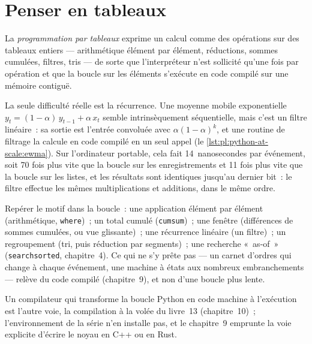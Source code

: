 \section{Penser en tableaux}

\begin{definition}\label{def:pl:python-at-scale:array}
La \emph{programmation par tableaux} exprime un calcul comme des opérations sur des tableaux entiers --- arithmétique
élément par élément, réductions, sommes cumulées, filtres, tris --- de sorte que l'interpréteur n'est sollicité qu'une fois par opération et que la boucle
sur les éléments s'exécute en code compilé sur une mémoire contiguë.
\end{definition}

La seule difficulté réelle est la récurrence. Une moyenne mobile exponentielle $y_t = (1-\alpha)\,y_{t-1} + \alpha\,x_t$ semble intrinsèquement
séquentielle, mais c'est un filtre linéaire~: sa sortie est l'entrée convoluée avec $\alpha(1-\alpha)^k$, et une routine de filtrage la calcule
en code compilé en un seul appel (le \cref{lst:pl:python-at-scale:ewma}). Sur l'ordinateur portable, cela fait 14~nanosecondes par événement, soit 70 fois
plus vite que la boucle sur les enregistrements et 11 fois plus vite que la boucle sur les listes, et les résultats sont identiques jusqu'au dernier bit~:
le filtre effectue les mêmes multiplications et additions, dans le même ordre.

\label{lst:pl:python-at-scale:ewma}

\begin{method}\label{met:pl:python-at-scale:arrays}
Repérer le motif dans la boucle~: une application élément par élément (arithmétique, \texttt{where})~; un total cumulé (\texttt{cumsum})~; une fenêtre
(différences de sommes cumulées, ou vue glissante)~; une récurrence linéaire (un filtre)~; un regroupement (tri, puis réduction par segments)~;
une recherche «~as-of~» (\texttt{searchsorted}, chapitre~4). Ce qui ne s'y prête pas --- un carnet d'ordres qui change à chaque événement, une machine
à états aux nombreux embranchements --- relève du code compilé (chapitre~9), et non d'une boucle plus lente.
\end{method}

Un compilateur qui transforme la boucle Python en code machine à l'exécution est l'autre voie, la compilation à la volée du
livre~13 (chapitre~10)~; l'environnement de la série n'en installe pas, et le chapitre~9 emprunte la voie explicite d'écrire le noyau
en C++ ou en Rust.


